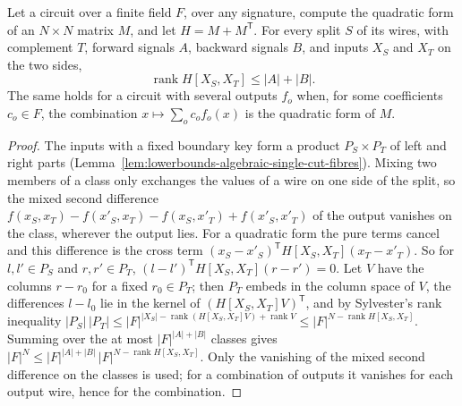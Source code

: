 \begin{theorem}
  \label{thm:lowerbounds-algebraic-quadratic-rank-cut}
  \leanok
  Let a circuit over a finite field $F$, over any signature, compute the
  quadratic form of an $N\times N$ matrix $M$, and let $H=M+M^{\mathsf T}$.
  For every split $S$ of its wires, with complement $T$, forward signals $A$,
  backward signals $B$, and inputs $X_S$ and $X_T$ on the two sides,
  \[
    \operatorname{rank} H[X_S, X_T] \le |A| + |B| .
  \]
  The same holds for a circuit with several outputs $f_o$ when, for some
  coefficients $c_o\in F$, the combination $x\mapsto\sum_o c_of_o(x)$ is
  the quadratic form of $M$.
\end{theorem}
\begin{proof}
  \leanok
  The inputs with a fixed boundary key form a product $P_S\times P_T$ of
  left and right parts
  (Lemma~\ref{lem:lowerbounds-algebraic-single-cut-fibres}). Mixing two
  members of a class only exchanges the values of a wire on one side of the
  split, so the mixed second difference
  $f(x_S,x_T)-f(x'_S,x_T)-f(x_S,x'_T)+f(x'_S,x'_T)$ of the output vanishes
  on the class, wherever the output lies. For a quadratic form the pure
  terms cancel and this difference is the cross term
  $(x_S-x'_S)^{\mathsf T}H[X_S,X_T](x_T-x'_T)$. So for $l,l'\in P_S$ and
  $r,r'\in P_T$, $(l-l')^{\mathsf T}H[X_S,X_T](r-r')=0$. Let $V$ have the
  columns $r-r_0$ for a fixed $r_0\in P_T$; then $P_T$ embeds in the column
  space of $V$, the differences $l-l_0$ lie in the kernel of
  $(H[X_S,X_T]V)^{\mathsf T}$, and by Sylvester's rank inequality
  $|P_S|\,|P_T|\le|F|^{|X_S|-\operatorname{rank}(H[X_S,X_T]V)+\operatorname{rank}V}
  \le|F|^{N-\operatorname{rank}H[X_S,X_T]}$. Summing over the at most
  $|F|^{|A|+|B|}$ classes gives $|F|^N\le|F|^{|A|+|B|}\,
  |F|^{N-\operatorname{rank}H[X_S,X_T]}$. Only the vanishing of the mixed
  second difference on the classes is used; for a combination of outputs it
  vanishes for each output wire, hence for the combination.
\end{proof}

